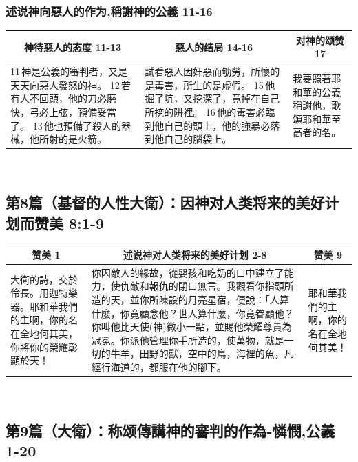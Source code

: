 \subsubsection{述说神向惡人的作为,稱謝神的公義  11-16}
\begin{table}[H]
\centering
\begin{tabular}{p{}|p{19.5em}|p{6.5em}}\hline\hline
\multicolumn{1}{c|}{神待惡人的态度 11-13}&\multicolumn{1}{c|}{惡人的结局 14-16}&\multicolumn{1}{c}{对神的颂赞 17}\\\hline
11 神是公義的審判者，又是天天向惡人發怒的神。
12 若有人不回頭，他的刀必磨快，弓必上弦，預備妥當了。
13 他也預備了殺人的器械，他所射的是火箭。
&試看惡人因奸惡而劬勞，所懷的是毒害，所生的是虛假。
15 他掘了坑，又挖深了，竟掉在自己所挖的阱裡。
16 他的毒害必臨到他自己的頭上，他的強暴必落到他自己的腦袋上。
&我要照著耶和華的公義稱謝他，歌頌耶和華至高者的名。\\\hline
\end{tabular}
\end{table} 



\subsection{第8篇（基督的人性大衛）：因神对人类将来的美好计划而赞美  8:1-9}
\begin{table}[H]
\centering
\begin{tabular}{p{}|p{35em}|p{4.5em}}\hline\hline
\multicolumn{1}{c|}{赞美 1}&\multicolumn{1}{c|}{述说神对人类将来的美好计划  2-8}&\multicolumn{1}{c}{赞美 9}\\\hline
大衛的詩，交於伶長。用迦特樂器。耶和華我們的主啊，你的名在全地何其美，你將你的榮耀彰顯於天！
&你因敵人的緣故，從嬰孩和吃奶的口中建立了能力，使仇敵和報仇的閉口無言。我觀看你指頭所造的天，並你所陳設的月亮星宿，便說：「人算什麼，你竟顧念他？世人算什麼，你竟眷顧他？你叫他比天使(神)微小一點，並賜他榮耀尊貴為冠冕。你派他管理你手所造的，使萬物，就是一切的牛羊，田野的獸，空中的鳥，海裡的魚，凡經行海道的，都服在他的腳下。
&耶和華我們的主啊，你的名在全地何其美！\\\hline
\end{tabular}
\end{table} 


\subsection{第9篇（大衛）：称颂傳講神的審判的作為-憐憫,公義  1-20}
